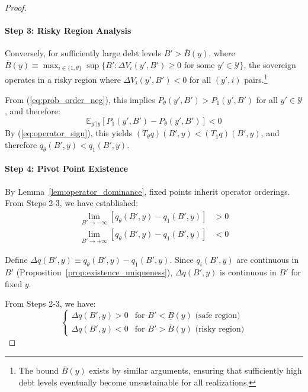 \documentclass[12pt]{article}
\theoremstyle{plain}
\begin{document}
\begin{proof}
	\paragraph{Step 3: Risky Region Analysis} Conversely, for sufficiently large debt levels $B' > \overline{B}(y)$, where
	$\overline{B}(y) \equiv \max_{i \in \{1,\theta\}} \sup\{B' : \Delta V_i(y', B')
		\geq 0 \text{ for some } y' \in \mathcal{Y}\}$, the sovereign operates in a
	risky region where $\Delta V_i(y', B') < 0$ for all $(y', i)$
	pairs.\footnote{The bound $\overline{B}(y)$ exists by similar arguments,
		ensuring that sufficiently high debt levels eventually become unsustainable for
		all realizations.}

	From (\ref{eq:prob_order_neg}), this implies $P_\theta(y', B') > P_1(y', B')$
	for all $y' \in \mathcal{Y}$, and therefore:
	\begin{equation}
		\mathbb{E}_{y'|y}[P_1(y', B') - P_\theta(y', B')] < 0 \label{eq:risky_expectation}
	\end{equation}
	By (\ref{eq:operator_sign}), this yields $(T_\theta q)(B', y) < (T_1 q)(B', y)$, and therefore $q_\theta(B', y) < q_1(B', y)$.

	\paragraph{Step 4: Pivot Point Existence} By Lemma~\ref{lem:operator_dominance}, fixed points inherit operator orderings.
	From Steps 2-3, we have established:
	\begin{align}
		\lim_{B' \to -\infty} [q_\theta(B', y) - q_1(B', y)] & > 0 \label{eq:limit_safe}  \\
		\lim_{B' \to +\infty} [q_\theta(B', y) - q_1(B', y)] & < 0 \label{eq:limit_risky}
	\end{align}

	Define $\Delta q(B', y) \equiv q_\theta(B', y) - q_1(B', y)$. Since $q_i(B',
		y)$ are continuous in $B'$ (Proposition~\ref{prop:existence_uniqueness}),
	$\Delta q(B', y)$ is continuous in $B'$ for fixed $y$.

	From Steps 2-3, we have:
	\begin{equation}
		\begin{cases}
			\Delta q(B', y) > 0 & \text{for } B' < \underline{B}(y) \text{ (safe region)} \\
			\Delta q(B', y) < 0 & \text{for } B' > \overline{B}(y) \text{ (risky region)}
		\end{cases} \label{eq:regional_ordering}
	\end{equation}


\end{proof}
\end{document}
